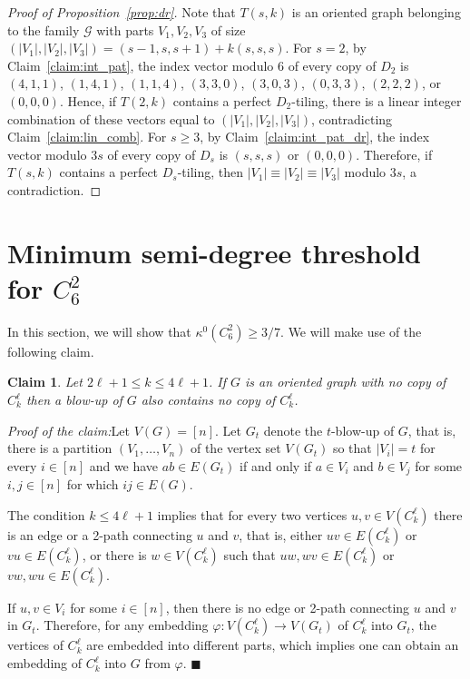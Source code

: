 \documentclass[11pt]{amsart}
\newtheorem{claim}[theorem]{Claim}
\newcommand{\G}{\mathcal{G}}
\newenvironment{claimproof}[1]{\par\noindent\textit{Proof of the claim:}\space#1}{\leavevmode\unskip\penalty9999 \hbox{}\nobreak\hfill\quad\hbox{$\blacksquare$}}
\begin{document}
\begin{proof}[Proof of Proposition~\ref{prop:dr}]
    Note that $T(s,k)$ is an oriented graph belonging to the family $\G$ with parts $V_1, V_2, V_3$ of size $(|V_1|, |V_2|, |V_3|) = (s-1,s,s+1) + k (s,s,s)$.
    For $s=2$, by Claim~\ref{claim:int_pat}, the index vector modulo 6 of every copy of $D_2$ is $(4,1,1)$, $(1,4,1)$, $(1,1,4)$, $(3,3,0)$, $(3,0,3)$, $(0,3,3)$, $(2,2,2)$, or $(0,0,0)$. Hence, if $T(2,k)$ contains a perfect $D_2$-tiling, there is a linear integer combination of these vectors equal to $(|V_1|, |V_2|, |V_3|)$, contradicting Claim~\ref{claim:lin_comb}.    
    For $s\ge 3$, by Claim~\ref{claim:int_pat_dr}, the index vector modulo $3s$ of every copy of $D_s$ is $(s,s,s)$ or $(0,0,0)$. Therefore, if $T(s,k)$ contains a perfect $D_s$-tiling, then $|V_1|\equiv |V_2| \equiv |V_3|$ modulo $3s$, a contradiction.  
\end{proof}

\section{Minimum semi-degree threshold for $C_6^2$} \label{sec:kappa}

In this section, we will show that $\kappa^0(C_6^2) \ge 3/7$. We will make use of the following claim.

\begin{claim} \label{claim:blowup}
    Let $2\ell+1 \le k \le 4 \ell+1$. If $G$ is an oriented graph with no copy of $C_{k}^\ell$ then a blow-up of $G$ also contains no copy of $C_{k}^\ell$.
\end{claim}

\begin{claimproof}
    Let $V(G)=[n]$.
    Let $G_t$ denote the $t$-blow-up of $G$, that is, there is a partition $( V_1, \dots, V_n )$ of the vertex set $V(G_t)$ so that $|V_i|=t$ for every $i \in [n]$ and we have $ab \in E(G_t)$ if and only if $a \in V_i$ and $b \in V_j$ for some $i,j \in [n]$ for which $ij \in E(G)$.

    The condition $k \le 4 \ell+1$ implies that for every two vertices $u,v \in V(C_k^\ell)$ there is an edge or a 2-path connecting $u$ and $v$, that is, either $uv \in E(C_k^\ell)$ or $vu \in E(C_k^\ell)$, or there is $w \in V(C_k^\ell)$ such that $uw, wv \in E(C_k^\ell)$ or $vw, wu \in E(C_k^\ell)$.

    If $u, v \in V_i$ for some $i \in [n]$, then there is no edge or 2-path connecting $u$ and $v$ in $G_t$. Therefore, for any embedding $\varphi: V(C_k^\ell) \to V(G_t)$ of $C_k^\ell$ into $G_t$, the vertices of $C_k^\ell$ are embedded into different parts, which implies one can obtain an embedding of $C_k^\ell$ into $G$ from $\varphi$.  
\end{claimproof}
\end{document}
